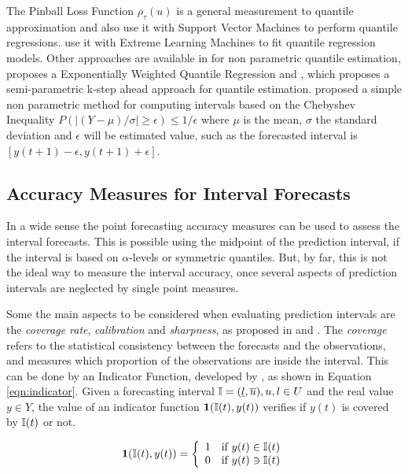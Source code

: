 The Pinball Loss Function $\rho_\tau(u)$ is a general measurement to quantile approximation and \cite{Steinwart2011} also use it with Support Vector Machines to perform quantile regressions. \cite{Wan2014} use it with Extreme Learning Machines to fit quantile regression models. Other approaches are available in \cite{Takeuchi2006} for non parametric quantile estimation,  \cite{Taylor2007} proposes a Exponentially Weighted Quantile Regression and \cite{Hansen2006}, which proposes a semi-parametric k-step ahead approach for quantile estimation. \cite{Gardner1998} proposed a simple non parametric method for computing intervals based on the Chebyshev Inequality $P(|(Y-\mu)/\sigma|\geq \epsilon) \leq 1/\epsilon$ where $\mu$ is the mean, $\sigma$ the standard deviation and $\epsilon$ will be estimated value, such as the forecasted interval is $[y(t+1) - \epsilon, y(t+1) + \epsilon]$.

%
\subsection{Accuracy Measures for Interval Forecasts}
\label{sec:prob_interval_measures}

In a wide sense the point forecasting accuracy measures can be used to assess the interval forecasts. This is possible using the midpoint of the prediction interval, if the interval is based on $\alpha$-levels or symmetric quantiles. But, by far, this is not the ideal way to measure the interval accuracy, once several aspects of prediction intervals are neglected by single point measures.

Some the main aspects to be considered when evaluating prediction intervals are the \textit{coverage rate}, \textit{calibration} and \textit{sharpness}, as proposed in \cite{Gneiting2007} and \cite{Pinson2006}. The \textit{coverage} refers to the statistical consistency between the forecasts and the observations, and measures which proportion of the observations are inside the interval. This can be done by an Indicator Function, developed by \cite{Christoffersen1998}, as shown in Equation \ref{eqn:indicator}. Given a forecasting interval $\mathbb{I} = (\underline{l},\overline{u}), u,l \in U$ and the real value $y\in Y$, the value of an indicator function $\mathbf{1}(\mathbb{I}(t),y(t))$ verifies if $y(t)$ is covered by $\mathbb{I}(t)$ or not.

\begin{equation}
\mathbf{1}(\mathbb{I}(t),y(t)) = \left\{ \begin{array}{cl}
1 & \text{if }y(t) \in \mathbb{I}(t) \\
0 & \text{if }y(t) \ni \mathbb{I}(t) 
\end{array} \right.
\label{eqn:indicator}
\end{equation}


